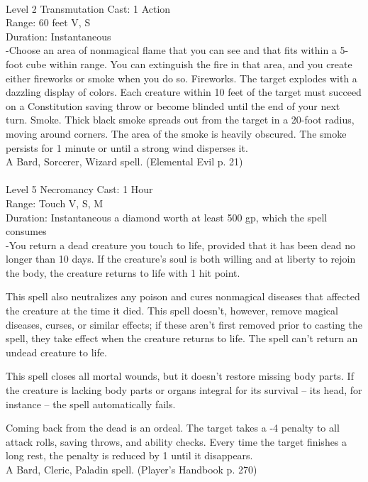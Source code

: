 \documentclass[10pt,twocolumn]{report}
\begin{document}
 \\
Level 2 \quad Transmutation \quad Cast: 1 Action\\
Range: 60 feet \quad V, S\\
Duration: Instantaneous \quad \\
-Choose an area of nonmagical flame that you can see and that fits within a 5-foot cube within range. You can extinguish the fire in that area, and you create either fireworks or smoke when you do so.
Fireworks. The target explodes with a dazzling display of colors. Each creature within 10 feet of the target must succeed on a Constitution saving throw or become blinded until the end of your next turn.
Smoke. Thick black smoke spreads out from the target in a 20-foot radius, moving around corners. The area of the smoke is heavily obscured. The smoke persists for 1 minute or until a strong wind disperses it.\\
A Bard, Sorcerer, Wizard spell. (Elemental Evil p. 21) \\


 \\
Level 5 \quad Necromancy \quad Cast: 1 Hour\\
Range: Touch \quad V, S, M\\
Duration: Instantaneous \quad a diamond worth at least 500 gp, which the spell consumes\\
-You return a dead creature you touch to life, provided that it has been dead no longer than 10 days. If the creature’s soul is both willing and at liberty to rejoin the body, the creature returns to life with 1 hit point.

This spell also neutralizes any poison and cures nonmagical diseases that affected the creature at the time it died. This spell doesn’t, however, remove magical diseases, curses, or similar effects; if these aren’t first removed prior to casting the spell, they take effect when the creature returns to life. The spell can’t return an undead creature to life.

This spell closes all mortal wounds, but it doesn’t restore missing body parts. If the creature is lacking body parts or organs integral for its survival – its head, for instance – the spell automatically fails.

Coming back from the dead is an ordeal. The target takes a -4 penalty to all attack rolls, saving throws, and ability checks. Every time the target finishes a long rest, the penalty is reduced by 1 until it disappears.\\
A Bard, Cleric, Paladin spell. (Player's Handbook p. 270) \\
\end{document}
